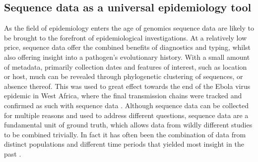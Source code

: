 \documentclass[11pt,oneside,letterpaper]{article}
\begin{document}

\subsection*{Sequence data as a universal epidemiology tool}
As the field of epidemiology enters the age of genomics sequence data are likely to be brought to the forefront of epidemiological investigations.
At a relatively low price, sequence data offer the combined benefits of diagnostics and typing, whilst also offering insight into a pathogen's evolutionary history.
With a small amount of metadata, primarily collection dates and features of interest, such as location or host, much can be revealed through phylogenetic clustering of sequences, or absence thereof.
This was used to great effect towards the end of the Ebola virus epidemic in West Africa, where the final transmission chains were tracked and confirmed as such with sequence data \citep{arias_rapid_2016}.
Although sequence data can be collected for multiple reasons and used to address different questions, sequence data are a fundamental unit of ground truth, which allows data from wildly different studies to be combined trivially.
In fact it has often been the combination of data from distinct populations and different time periods that yielded most insight in the past \citep{dudas_virus_2017}.
\end{document}
